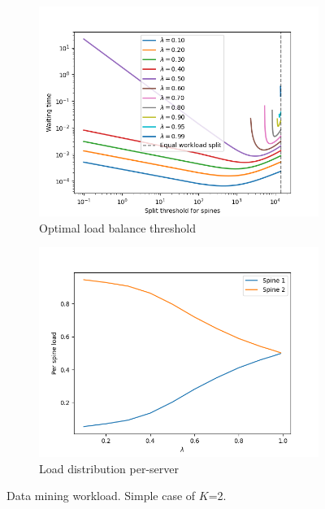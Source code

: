 \begin{figure}
	\centering
	\begin{subfigure}{.5\textwidth}
		\centering
		\includegraphics[width=.99\linewidth]{Chapter3/Figures/equal_workload_split_bpdm}
		\caption{Optimal load balance threshold}
		\label{fig:cost-dm}
	\end{subfigure}%
	\begin{subfigure}{.5\textwidth}
		\centering
		\includegraphics[width=.99\linewidth]{Chapter3/Figures/per_spine_load_bpdm}
		\caption{Load distribution per-server }
		\label{fig:perspineload-dm}
	\end{subfigure}
	\caption{Data mining workload. Simple case of $K$=2.}
	\label{fig:lbthreshold-dm}
\end{figure}%
